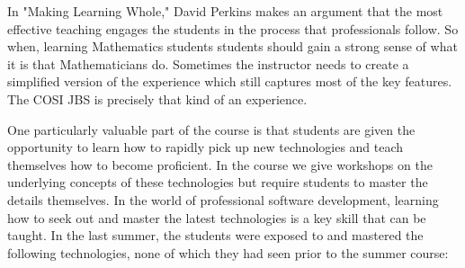 \documentclass{sig-alternate}
\begin{document}
In "Making Learning Whole," David Perkins makes an argument that the most effective teaching engages the students in the process that professionals follow.  So when, learning Mathematics students students should gain a strong sense of what it is that Mathematicians do. Sometimes the instructor needs to create a simplified version of the experience which still captures most of the key features.  The COSI JBS is precisely that kind of an experience.

One particularly valuable part of the course is that students are given the opportunity to learn  how to rapidly pick up new technologies and teach themselves how to become proficient. In the course we give workshops on the underlying concepts of these technologies but require students to master the details themselves. In the world of professional software development, learning how to seek out and master the latest technologies is a key skill that can be taught. In the last summer, the students were exposed to and mastered the following technologies, none of which they had seen prior to the summer course: 
\end{document}
